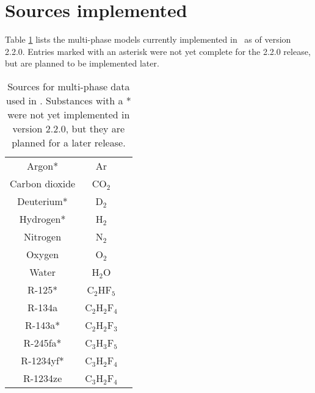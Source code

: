 \section{Sources implemented}
Table \ref{tab:mp:source} lists the multi-phase models currently implemented in \PM\ as of version 2.2.0.  Entries marked with an asterisk were not yet complete for the 2.2.0 release, but are planned to be implemented later.

\begin{table}
\centering
\caption{Sources for multi-phase data used in \PM.  Substances with a * were not yet implemented in version 2.2.0, but they are planned for a later release.}\label{tab:mp:source}
\begin{tabular}{|ccc|}
\hline
Argon* & Ar & \cite{tegeler:1999}\\
Carbon dioxide & CO$_2$ & \cite{span:1994}\\
Deuterium* & D$_2$ & \cite{richardson:2013}\\
Hydrogen* & H$_2$ & \cite{leachman:2009}\\
Nitrogen & N$_2$ & \cite{span:2000}\\
Oxygen & O$_2$ & \cite{setzmann:1991}\\
Water & H$_2$O & \cite{iapws:2014}\\
R-125* & C$_2$HF$_5$ & \cite{piao:1998}\\
R-134a & C$_2$H$_2$F$_4$ & \cite{tilner:1994}\\
R-143a* & C$_2$H$_2$F$_3$ & \cite{lemmon:2000}\\
R-245fa* & C$_3$H$_3$F$_5$ & \cite{akasaka:2015}\\
R-1234yf* & C$_3$H$_2$F$_4$ & \cite{richter:2011}\\
R-1234ze & C$_3$H$_2$F$_4$ & \cite{thol:2016}\\
\hline
\end{tabular}
\end{table}
